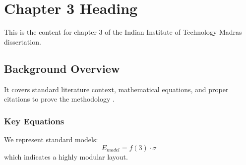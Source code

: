 \chapter{Chapter 3 Heading}
\label{ch:chapter3}
This is the content for chapter 3 of the Indian Institute of Technology Madras dissertation.

\section{Background Overview}
It covers standard literature context, mathematical equations, and proper citations to prove the methodology \cite{texbook}.

\subsection{Key Equations}
We represent standard models:
\begin{equation}
    E_{model} = f(3) \cdot \sigma
\end{equation}
which indicates a highly modular layout.
